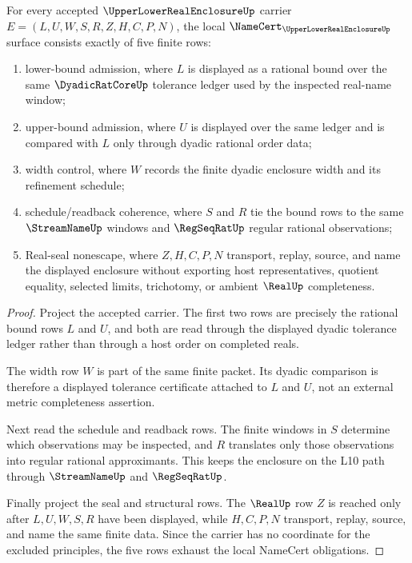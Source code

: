 \begin{theorem}
\label{thm:upper-lower-real-enclosure-namecert-obligations}
For every accepted $\UpperLowerRealEnclosureUp$ carrier $E=(L,U,W,S,R,Z,H,C,P,N)$, the local $\NameCert_{\UpperLowerRealEnclosureUp}$ surface consists exactly of five finite rows:
\begin{enumerate}
\item lower-bound admission, where $L$ is displayed as a rational bound over the same $\DyadicRatCoreUp$ tolerance ledger used by the inspected real-name window;
\item upper-bound admission, where $U$ is displayed over the same ledger and is compared with $L$ only through dyadic rational order data;
\item width control, where $W$ records the finite dyadic enclosure width and its refinement schedule;
\item schedule/readback coherence, where $S$ and $R$ tie the bound rows to the same $\StreamNameUp$ windows and $\RegSeqRatUp$ regular rational observations;
\item Real-seal nonescape, where $Z,H,C,P,N$ transport, replay, source, and name the displayed enclosure without exporting host representatives, quotient equality, selected limits, trichotomy, or ambient $\RealUp$ completeness.
\end{enumerate}
\end{theorem}
\begin{proof}
Project the accepted carrier. The first two rows are precisely the rational bound rows $L$ and $U$, and both are read through the displayed dyadic tolerance ledger rather than through a host order on completed reals.

The width row $W$ is part of the same finite packet. Its dyadic comparison is therefore a displayed tolerance certificate attached to $L$ and $U$, not an external metric completeness assertion.

Next read the schedule and readback rows. The finite windows in $S$ determine which observations may be inspected, and $R$ translates only those observations into regular rational approximants. This keeps the enclosure on the L10 path through $\StreamNameUp$ and $\RegSeqRatUp$.

Finally project the seal and structural rows. The $\RealUp$ row $Z$ is reached only after $L,U,W,S,R$ have been displayed, while $H,C,P,N$ transport, replay, source, and name the same finite data. Since the carrier has no coordinate for the excluded principles, the five rows exhaust the local NameCert obligations.
\end{proof}


